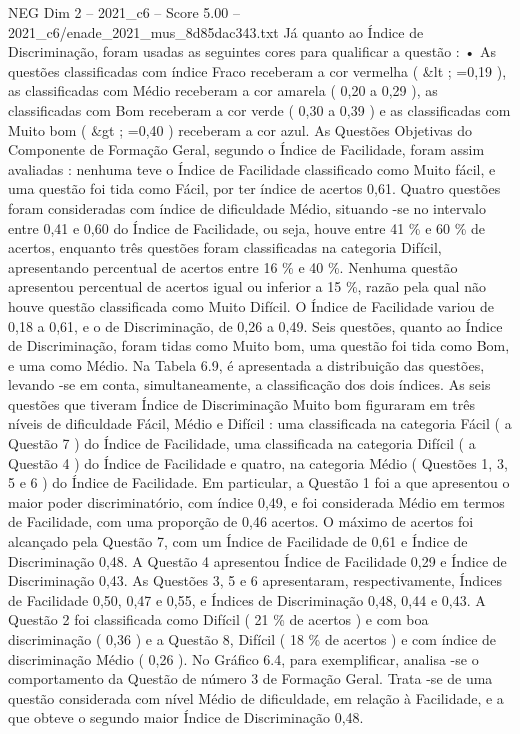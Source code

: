 \begin{textsample}{NEG Dim 2 – 2021\_c6 – Score 5.00 – 2021\_c6/enade\_2021\_mus\_8d85dac343.txt}
Já quanto ao Índice de Discriminação, foram usadas as seguintes cores para qualificar a questão : • As questões classificadas com índice Fraco receberam a cor vermelha ( \&lt ; =0,19 ), as classificadas com Médio receberam a cor amarela ( 0,20 a 0,29 ), as classificadas com Bom receberam a cor verde ( 0,30 a 0,39 ) e as classificadas com Muito bom ( \&gt ; =0,40 ) receberam a cor azul.
As Questões Objetivas do Componente de Formação Geral, segundo o Índice de Facilidade, foram assim avaliadas : nenhuma teve o Índice de Facilidade classificado como Muito fácil, e uma questão foi tida como Fácil, por ter índice de acertos 0,61.
Quatro questões foram consideradas com índice de dificuldade Médio, situando -se no intervalo entre 0,41 e 0,60 do Índice de Facilidade, ou seja, houve entre 41 \% e 60 \% de acertos, enquanto três questões foram classificadas na categoria Difícil, apresentando percentual de acertos entre 16 \% e 40 \%.
Nenhuma questão apresentou percentual de acertos igual ou inferior a 15 \%, razão pela qual não houve questão classificada como Muito Difícil.
O Índice de Facilidade variou de 0,18 a 0,61, e o de Discriminação, de 0,26 a 0,49.
Seis questões, quanto ao Índice de Discriminação, foram tidas como Muito bom, uma questão foi tida como Bom, e uma como Médio.
Na Tabela 6.9, é apresentada a distribuição das questões, levando -se em conta, simultaneamente, a classificação dos dois índices.
As seis questões que tiveram Índice de Discriminação Muito bom figuraram em três níveis de dificuldade Fácil, Médio e Difícil : uma classificada na categoria Fácil ( a Questão 7 ) do Índice de Facilidade, uma classificada na categoria Difícil ( a Questão 4 ) do Índice de Facilidade e quatro, na categoria Médio ( Questões 1, 3, 5 e 6 ) do Índice de Facilidade.
Em particular, a Questão 1 foi a que apresentou o maior poder discriminatório, com índice 0,49, e foi considerada Médio em termos de Facilidade, com uma proporção de 0,46 acertos.
O máximo de acertos foi alcançado pela Questão 7, com um Índice de Facilidade de 0,61 e Índice de Discriminação 0,48.
A Questão 4 apresentou Índice de Facilidade 0,29 e Índice de Discriminação 0,43.
As Questões 3, 5 e 6 apresentaram, respectivamente, Índices de Facilidade 0,50, 0,47 e 0,55, e Índices de Discriminação 0,48, 0,44 e 0,43.
A Questão 2 foi classificada como Difícil ( 21 \% de acertos ) e com boa discriminação ( 0,36 ) e a Questão 8, Difícil ( 18 \% de acertos ) e com índice de discriminação Médio ( 0,26 ).
No Gráfico 6.4, para exemplificar, analisa -se o comportamento da Questão de número 3 de Formação Geral.
Trata -se de uma questão considerada com nível Médio de dificuldade, em relação à Facilidade, e a que obteve o segundo maior Índice de Discriminação 0,48.

\end{textsample}
